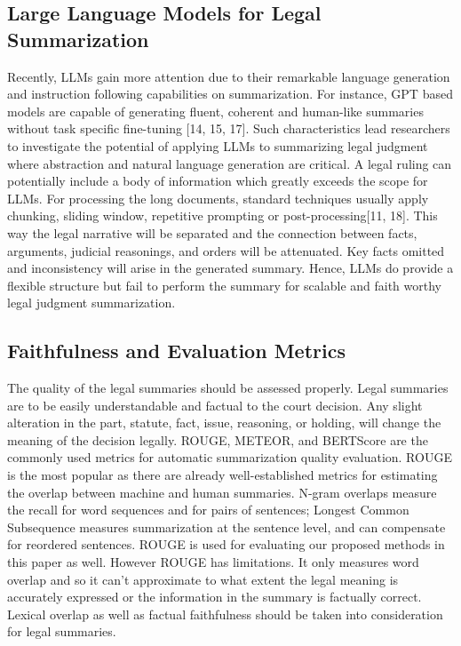 \documentclass[11pt, a4paper]{article}
\theoremstyle{plain}%
\theoremstyle{remark}%
\theoremstyle{definition}%
\begin{document}
\subsection{Large Language Models for Legal Summarization}

Recently, LLMs gain more attention due to their remarkable language generation and instruction following capabilities on summarization. For instance, GPT based models are capable of generating fluent, coherent and human-like summaries without task specific fine-tuning [14, 15, 17]. Such characteristics lead researchers to investigate the potential of applying LLMs to summarizing legal judgment where abstraction and natural language generation are critical. A legal ruling can potentially include a body of information which greatly exceeds the scope for LLMs. For processing the long documents, standard techniques usually apply chunking, sliding window, repetitive prompting or post-processing[11, 18]. This way the legal narrative will be separated and the connection between facts, arguments, judicial reasonings, and orders will be attenuated. Key facts omitted and inconsistency will arise in the generated summary. Hence, LLMs do provide a flexible structure but fail to perform the summary for scalable and faith worthy legal judgment summarization.


\subsection{Faithfulness and Evaluation Metrics}
The quality of the legal summaries should be assessed properly. Legal summaries are to be easily understandable and factual to the court decision. Any slight alteration in the part, statute, fact, issue, reasoning, or holding, will change the meaning of the decision legally. ROUGE, METEOR, and BERTScore are the commonly used metrics for automatic summarization quality evaluation. ROUGE is the most popular as there are already well-established metrics for estimating the overlap between machine and human summaries. N-gram overlaps measure the recall for word sequences and for pairs of sentences; Longest Common Subsequence measures summarization at the sentence level, and can compensate for reordered sentences. ROUGE is used for evaluating our proposed methods in this paper as well. However ROUGE has limitations. It only measures word overlap and so it can't approximate to what extent the legal meaning is accurately expressed or the information in the summary is factually correct. Lexical overlap as well as factual faithfulness should be taken into consideration for legal summaries.
\end{document}
